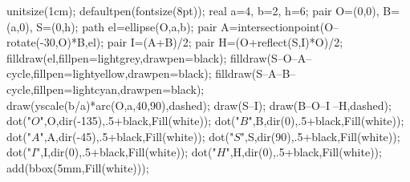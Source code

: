 \documentclass[border=10]{standalone}
\begin{document}
	\begin{asy}
	unitsize(1cm);
	defaultpen(fontsize(8pt));
	real a=4, b=2, h=6;
	pair O=(0,0), B=(a,0), S=(0,h);
	path el=ellipse(O,a,b);
	pair A=intersectionpoint(O--rotate(-30,O)*B,el);
	pair I=(A+B)/2;
	pair H=(O+reflect(S,I)*O)/2;
	filldraw(el,fillpen=lightgrey,drawpen=black);
	filldraw(S--O--A--cycle,fillpen=lightyellow,drawpen=black);
	filldraw(S--A--B--cycle,fillpen=lightcyan,drawpen=black);
	draw(yscale(b/a)*arc(O,a,40,90),dashed);
	draw(S--I);
	draw(B--O--I^^O--H,dashed);
	dot("$O$",O,dir(-135),.5+black,Fill(white));
	dot("$B$",B,dir(0),.5+black,Fill(white));
	dot("$A$",A,dir(-45),.5+black,Fill(white));
	dot("$S$",S,dir(90),.5+black,Fill(white));
	dot("$I$",I,dir(0),.5+black,Fill(white));
	dot("$H$",H,dir(0),.5+black,Fill(white));
	add(bbox(5mm,Fill(white)));
	\end{asy}
\end{document}
